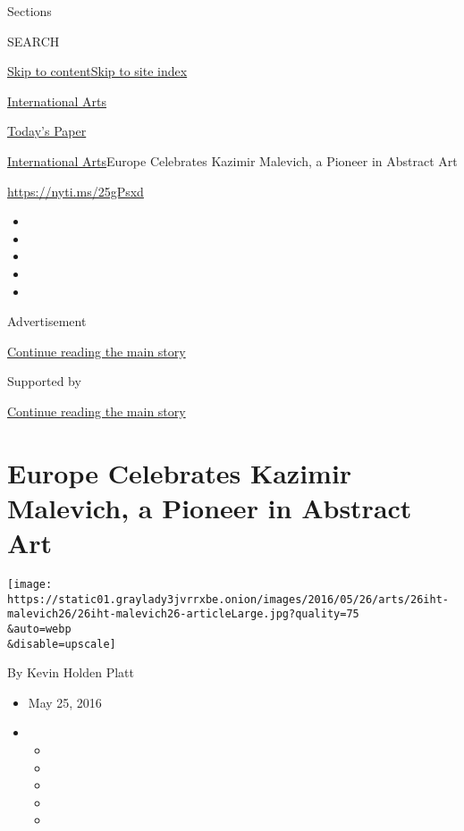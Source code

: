 Sections

SEARCH

\protect\hyperlink{site-content}{Skip to
content}\protect\hyperlink{site-index}{Skip to site index}

\href{https://www.nytimes3xbfgragh.onion/section/arts/international}{International
Arts}

\href{https://myaccount.nytimes3xbfgragh.onion/auth/login?response_type=cookie\&client_id=vi}{}

\href{https://www.nytimes3xbfgragh.onion/section/todayspaper}{Today's
Paper}

\href{/section/arts/international}{International Arts}\textbar{}Europe
Celebrates Kazimir Malevich, a Pioneer in Abstract Art

\url{https://nyti.ms/25gPsxd}

\begin{itemize}
\item
\item
\item
\item
\item
\end{itemize}

Advertisement

\protect\hyperlink{after-top}{Continue reading the main story}

Supported by

\protect\hyperlink{after-sponsor}{Continue reading the main story}

\hypertarget{europe-celebrates-kazimir-malevich-a-pioneer-in-abstract-art}{%
\section{Europe Celebrates Kazimir Malevich, a Pioneer in Abstract
Art}\label{europe-celebrates-kazimir-malevich-a-pioneer-in-abstract-art}}

\texttt{[image: https://static01.graylady3jvrrxbe.onion/images/2016/05/26/arts/26iht-malevich26/26iht-malevich26-articleLarge.jpg?quality=75\\\&auto=webp\\\&disable=upscale]}

By Kevin Holden Platt

\begin{itemize}
\item
  May 25, 2016
\item
  \begin{itemize}
  \item
  \item
  \item
  \item
  \item
  \end{itemize}
\end{itemize}

